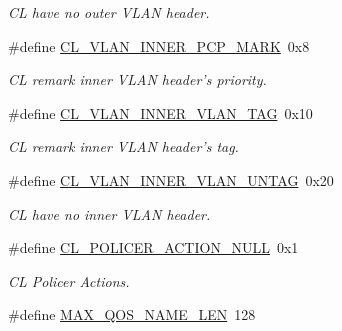 \begin{DoxyCompactItemize}
\begin{DoxyCompactList}\small\item\em C\-L have no outer V\-L\-A\-N header. \end{DoxyCompactList}\item 
\hypertarget{group__FAPI__QOS__CLASS_gac702b6959dde9942bb7702da40d04d93}{\#define \hyperlink{group__FAPI__QOS__CLASS_gac702b6959dde9942bb7702da40d04d93}{C\-L\-\_\-\-V\-L\-A\-N\-\_\-\-I\-N\-N\-E\-R\-\_\-\-P\-C\-P\-\_\-\-M\-A\-R\-K}~0x8}\label{group__FAPI__QOS__CLASS_gac702b6959dde9942bb7702da40d04d93}

\begin{DoxyCompactList}\small\item\em C\-L remark inner V\-L\-A\-N header's priority. \end{DoxyCompactList}\item 
\hypertarget{group__FAPI__QOS__CLASS_gaacfffe406e5cd30cef8ccde173a3c214}{\#define \hyperlink{group__FAPI__QOS__CLASS_gaacfffe406e5cd30cef8ccde173a3c214}{C\-L\-\_\-\-V\-L\-A\-N\-\_\-\-I\-N\-N\-E\-R\-\_\-\-V\-L\-A\-N\-\_\-\-T\-A\-G}~0x10}\label{group__FAPI__QOS__CLASS_gaacfffe406e5cd30cef8ccde173a3c214}

\begin{DoxyCompactList}\small\item\em C\-L remark inner V\-L\-A\-N header's tag. \end{DoxyCompactList}\item 
\hypertarget{group__FAPI__QOS__CLASS_gae0ae5549de00595583468b138805db24}{\#define \hyperlink{group__FAPI__QOS__CLASS_gae0ae5549de00595583468b138805db24}{C\-L\-\_\-\-V\-L\-A\-N\-\_\-\-I\-N\-N\-E\-R\-\_\-\-V\-L\-A\-N\-\_\-\-U\-N\-T\-A\-G}~0x20}\label{group__FAPI__QOS__CLASS_gae0ae5549de00595583468b138805db24}

\begin{DoxyCompactList}\small\item\em C\-L have no inner V\-L\-A\-N header. \end{DoxyCompactList}\item 
\#define \hyperlink{group__FAPI__QOS__CLASS_ga49bc0c5eb89e9a504cf3a6635beb7685}{C\-L\-\_\-\-P\-O\-L\-I\-C\-E\-R\-\_\-\-A\-C\-T\-I\-O\-N\-\_\-\-N\-U\-L\-L}~0x1
\begin{DoxyCompactList}\small\item\em C\-L Policer Actions. \end{DoxyCompactList}\item 
\hypertarget{group__FAPI__QOS__CLASS_gacbdea39cbf4ab5d35d49219652c30987}{\#define \hyperlink{group__FAPI__QOS__CLASS_gacbdea39cbf4ab5d35d49219652c30987}{M\-A\-X\-\_\-\-Q\-O\-S\-\_\-\-N\-A\-M\-E\-\_\-\-L\-E\-N}~128}\label{group__FAPI__QOS__CLASS_gacbdea39cbf4ab5d35d49219652c30987}


\end{DoxyCompactItemize}
